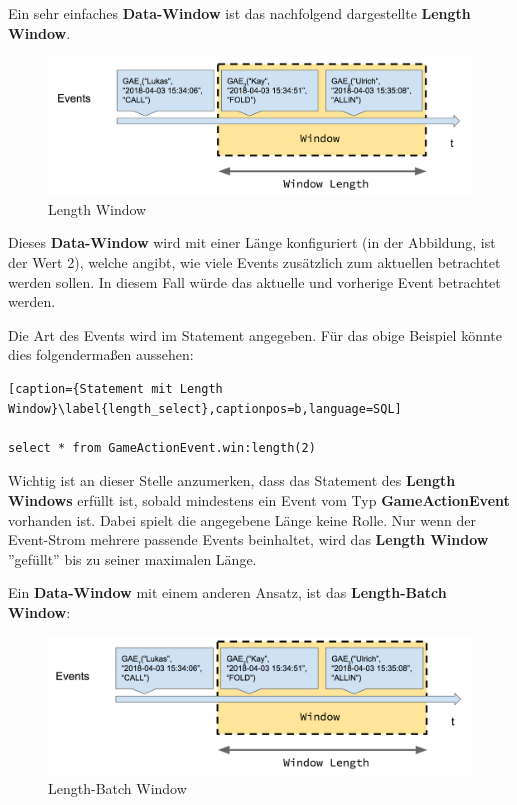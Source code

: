 Ein sehr einfaches \textbf{Data-Window} ist das nachfolgend dargestellte \textbf{Length Window}.

\begin{figure}[ht]
	\centering
	\includegraphics[width=\textwidth,height=\textheight,keepaspectratio]{images/data_window_length.png}
	\caption{Length Window}
	\label{LengthWindow}
\end{figure}

Dieses \textbf{Data-Window} wird mit einer Länge konfiguriert (in der Abbildung, ist der Wert 2), welche angibt, wie viele Events zusätzlich zum aktuellen betrachtet werden sollen. In diesem Fall würde das aktuelle und vorherige Event betrachtet werden.

Die Art des Events wird im Statement angegeben. Für das obige Beispiel könnte dies folgendermaßen aussehen:

\begin{lstlisting}[caption={Statement mit Length Window}\label{length_select},captionpos=b,language=SQL]

select * from GameActionEvent.win:length(2)

\end{lstlisting}

Wichtig ist an dieser Stelle anzumerken, dass das Statement des \textbf{Length Windows} erfüllt ist, sobald mindestens ein Event vom Typ \textbf{GameActionEvent} vorhanden ist. Dabei spielt die angegebene Länge keine Rolle. Nur wenn der Event-Strom mehrere passende Events beinhaltet, wird das \textbf{Length Window} ''gefüllt'' bis zu seiner maximalen Länge.

Ein \textbf{Data-Window} mit einem anderen Ansatz, ist das \textbf{Length-Batch Window}:

\begin{figure}[ht]
	\centering
	\includegraphics[width=\textwidth,height=\textheight,keepaspectratio]{images/data_window_length_batch.png}
	\caption{Length-Batch Window}
	\label{LengthBatchWindow}
\end{figure}

